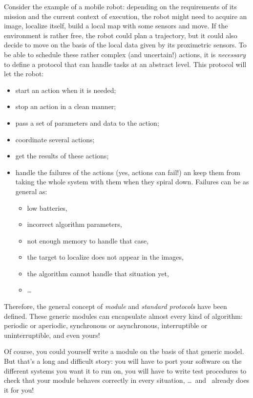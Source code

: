 Consider the example of a mobile  robot: depending on the requirements of
its mission and the current context of execution, the robot might need to
acquire an image, localize itself,  build a local  map with some  sensors
and  move.  If the  environment  is rather free, the  robot  could plan a
trajectory, but  it could also  decide to move on the  basis of the local
data given by its  proximetric  sensors.  To be   able to schedule  these
rather complex (and uncertain!) actions, it  is {\em necessary} to define
a protocol that can handle tasks at an abstract level. This protocol will
let the robot:

\begin{itemize}
\item start an action when it is needed;
\item stop an action in a clean manner;
\item pass a set of parameters and data to the action;
\item coordinate several actions;
\item get the results of these actions;
\item handle the failures of the actions (yes, actions can fail!) an keep
them from  taking the whole system with them when they spiral
down. Failures can be as general as:
   \begin{itemize}
   \item low batteries,
   \item incorrect algorithm parameters,
   \item not enough memory to handle that case,
   \item the target to localize does not appear in the images,
   \item the algorithm cannot handle that situation yet,
   \item \ldots
   \end{itemize}
\end{itemize}

Therefore,  the  general   concept  of  {\em module}  and   {\em standard
protocols}  have  been defined.   These  generic  modules can encapsulate
almost  every  kind of  algorithm:  periodic or aperiodic, synchronous or
asynchronous, interruptible or uninterruptible, and even yours!

Of course, you could yourself write a module on the basis of that generic
model. But that's a long and difficult story: you will  have to port your
software on the different systems you want it to run on, you will have to
write  test procedures to  check that  your  module behaves correctly  in
every situation, \ldots\ and \GenoM\ already does it for you!

